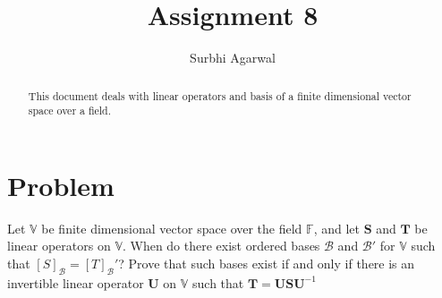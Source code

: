 \documentclass[journal,12pt,twocolumn]{IEEEtran}
\begin{document}
\let\StandardTheFigure\thefigure
\let\vec\mathbf

\renewcommand{\thefigure}{\theproblem}

\def\putbox#1#2#3{\makebox[0in][l]{\makebox[#1][l]{}\raisebox{\baselineskip}[0in][0in]{\raisebox{#2}[0in][0in]{#3}}}}
     \def\rightbox#1{\makebox[0in][r]{#1}}
     \def\centbox#1{\makebox[0in]{#1}}
     \def\topbox#1{\raisebox{-\baselineskip}[0in][0in]{#1}}
     \def\midbox#1{\raisebox{-0.5\baselineskip}[0in][0in]{#1}}
\vspace{3cm}

\title{Assignment 8}
\author{Surbhi Agarwal}

\maketitle

\newpage


\bigskip

\renewcommand{\thefigure}{\theenumi}
\renewcommand{\thetable}{\theenumi}

\begin{abstract}
This document deals with linear operators and basis of a finite dimensional vector space over a field.
\end{abstract}

\section{Problem}
Let $\mathbb V$ be finite dimensional vector space over the field $\mathbb F$, and let $\vec{S}$ and $\vec{T}$ be linear operators on $\mathbb V$. When do there exist ordered bases $\mathcal{B}$ and $\mathcal{B}'$ for $\mathbb V$ such that $[S]_\mathcal{B} = [T]_\mathcal{B}'$? Prove that such bases exist if and only if there is an invertible linear operator $\vec{U}$ on $\mathbb V$ such that $\vec{T} = \vec{U}\vec{S}\vec{U}^{-1}$
\end{document}

